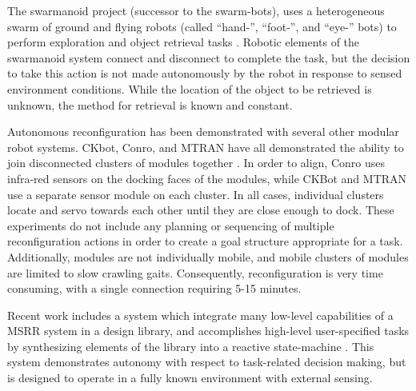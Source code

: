 \documentclass[conference]{IEEEtran}
\begin{document}
The swarmanoid project (successor to the swarm-bots), uses a heterogeneous swarm of ground and flying robots (called ``hand-'', ``foot-'', and ``eye-'' bots) to perform exploration and object retrieval tasks  \cite{Dorigo2013}. Robotic elements of the swarmanoid system connect and disconnect to complete the task, but the decision to take this action is not made autonomously by the robot in response to sensed environment conditions. While the location of the object to be retrieved is unknown, the method for retrieval is known and constant.

Autonomous reconfiguration has been demonstrated with several other modular robot systems. CKbot, Conro, and MTRAN have all demonstrated the ability to join disconnected clusters of modules together \cite{Yim2007, Rubenstein2004,Murata2006}. In order to align, Conro uses infra-red sensors on the docking faces of the modules, while CKBot and MTRAN use a separate sensor module on each cluster.  In all cases, individual clusters locate and servo towards each other until they are close enough to dock. These experiments do not include any planning or sequencing of multiple reconfiguration actions in order to create a goal structure appropriate for a task.  Additionally,  modules are not individually mobile, and mobile clusters of modules are limited to slow crawling gaits.  Consequently, reconfiguration is very time consuming, with a single connection requiring 5-15 minutes.


Recent work includes a system which integrate many low-level capabilities of a MSRR system in a design library, and accomplishes high-level user-specified tasks by synthesizing elements of the library into a reactive state-machine \cite{Jing2016}. This system demonstrates autonomy with respect to task-related decision making, but is designed to operate in a fully known environment with external sensing.
\end{document}
